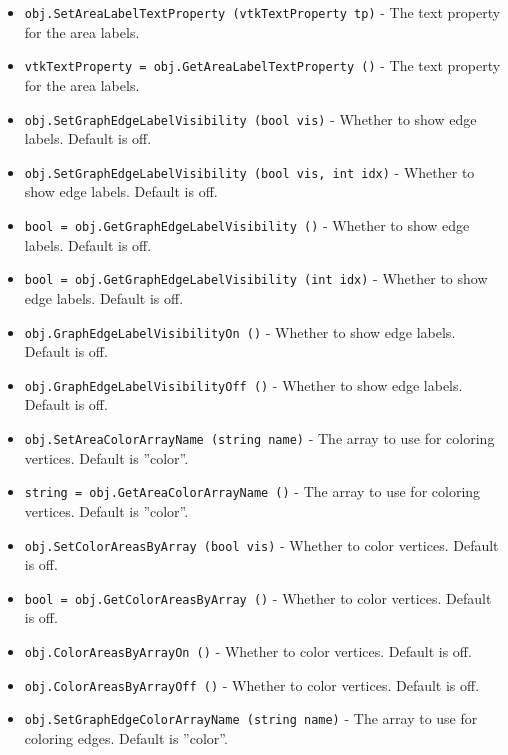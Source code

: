 \begin{itemize}
\item  \verb|obj.SetAreaLabelTextProperty (vtkTextProperty tp)| -  The text property for the area labels.

\item  \verb|vtkTextProperty = obj.GetAreaLabelTextProperty ()| -  The text property for the area labels.

\item  \verb|obj.SetGraphEdgeLabelVisibility (bool vis)| -  Whether to show edge labels.  Default is off.

\item  \verb|obj.SetGraphEdgeLabelVisibility (bool vis, int idx)| -  Whether to show edge labels.  Default is off.

\item  \verb|bool = obj.GetGraphEdgeLabelVisibility ()| -  Whether to show edge labels.  Default is off.

\item  \verb|bool = obj.GetGraphEdgeLabelVisibility (int idx)| -  Whether to show edge labels.  Default is off.

\item  \verb|obj.GraphEdgeLabelVisibilityOn ()| -  Whether to show edge labels.  Default is off.

\item  \verb|obj.GraphEdgeLabelVisibilityOff ()| -  Whether to show edge labels.  Default is off.

\item  \verb|obj.SetAreaColorArrayName (string name)| -  The array to use for coloring vertices.  Default is ''color''.

\item  \verb|string = obj.GetAreaColorArrayName ()| -  The array to use for coloring vertices.  Default is ''color''.

\item  \verb|obj.SetColorAreasByArray (bool vis)| -  Whether to color vertices.  Default is off.

\item  \verb|bool = obj.GetColorAreasByArray ()| -  Whether to color vertices.  Default is off.

\item  \verb|obj.ColorAreasByArrayOn ()| -  Whether to color vertices.  Default is off.

\item  \verb|obj.ColorAreasByArrayOff ()| -  Whether to color vertices.  Default is off.

\item  \verb|obj.SetGraphEdgeColorArrayName (string name)| -  The array to use for coloring edges.  Default is ''color''.


\end{itemize}
